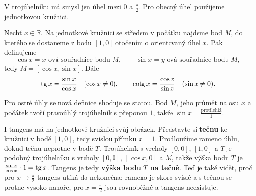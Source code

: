 V trojúhelníku má smysl jen úhel mezi $0$ a $\frac{\pi}{2}$. Pro obecný úhel použijeme jednotkovou kružnici.

\begin{definitionbox}
  Nechť $x\in\mathbb{R}$. Na jednotkové kružnici se středem v počátku najdeme bod $M$, do kterého se dostaneme z bodu $[1, 0]$ otočením o orientovaný úhel $x$. Pak definujeme
  \begin{equation*}
    \cos x = \text{$x$-ová souřadnice bodu } M,\qquad\sin x = \text{$y$-ová souřadnice bodu } M,
  \end{equation*}
  tedy $M = [\cos x, \sin x]$. Dále
  \begin{equation*}
    \operatorname{tg} x = \frac{\sin x}{\cos x}\quad(\cos x\neq 0),\qquad\operatorname{cotg} x = \frac{\cos x}{\sin x}\quad(\sin x\neq 0).
  \end{equation*}
\end{definitionbox}

\begin{center}
\end{center}

Pro ostré úhly se nová definice shoduje se starou. Bod $M$, jeho průmět na osu $x$ a počátek tvoří pravoúhlý trojúhelník s přeponou $1$, takže $\sin x = \frac{\text{protilehlá}}{1}$.

I tangens má na jednotkové kružnici svůj obrázek. Představte si \textbf{tečnu} ke kružnici v bodě $[1, 0]$, tedy svislou přímku $x = 1$. Prodloužíme rameno úhlu, dokud tečnu neprotne v bodě $T$. Trojúhelník s vrcholy $[0, 0]$, $[1, 0]$ a $T$ je podobný trojúhelníku s vrcholy $[0, 0]$, $[\cos x, 0]$ a $M$, takže výška bodu $T$ je $\frac{\sin x}{\cos x}\cdot 1 = \operatorname{tg} x$. Tangens je tedy \textbf{výška bodu $T$ na tečně}. Teď je také vidět, proč pro $x\to\frac{\pi}{2}$ tangens utíká do nekonečna: rameno je skoro svislé a s tečnou se protne vysoko nahoře, pro $x = \frac{\pi}{2}$ jsou rovnoběžné a tangens neexistuje.

